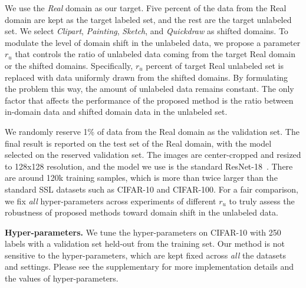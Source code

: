\documentclass[runningheads]{llncs}
\begin{document}
We use the \emph{Real} domain as our target. Five percent of the data from the Real domain are kept as the target labeled set, and the rest are the target unlabeled set.
We select \emph{Clipart}, \emph{Painting}, \emph{Sketch}, and \emph{Quickdraw} as shifted domains.
To modulate the level of domain shift in the unlabeled data, we propose a parameter $r_u$ that controls the ratio of unlabeled data coming from the target Real domain or the shifted domains.
Specifically, $r_u$ percent of target Real unlabeled set is replaced with data uniformly drawn from the shifted domains.
By formulating the problem this way, the amount of unlabeled data remains constant.
The only factor that affects the performance of the proposed method is the ratio between in-domain data and shifted domain data in the unlabeled set.

We randomly reserve 1\% of data from the Real domain as the validation set.
The final result is reported on the test set of the Real domain, with the model selected on the reserved validation set.
The images are center-cropped and resized to 128x128 resolution, and the model we use is the standard ResNet-18~\cite{he2016deep}.
There are around 120k training samples, which is more than twice larger than the standard SSL datasets such as CIFAR-10 and CIFAR-100.
For a fair comparison, we fix  \emph{all} hyper-parameters across experiments of different $r_u$ to truly assess the robustness of proposed methods toward domain shift in the unlabeled data.

\noindent
\textbf{Hyper-parameters.}
We tune the hyper-parameters on CIFAR-10 with 250 labels with a validation set held-out from the training set.
Our method is not sensitive to the hyper-parameters, which are kept fixed across \emph{all} the datasets and settings.
Please see the supplementary for more implementation details and the values of hyper-parameters.


\begin{table*}[t]
\centering
\renewcommand{\arraystretch}{1.2}
\caption{
Comparison between the image-based baseline with our proposed feature-based augmentation method on DomainNet with 1) unlabeled data coming from the same domain as the labeled target ($r_u = 0 \%$), and 2) half of unlabeled data coming from the same domain as the labeled target and the other half from shifted domains ($r_u = 50 \%$).
Numbers are error rates across 3 runs.
}
\label{table:domainnet}
\end{table*}
 
\end{document}
